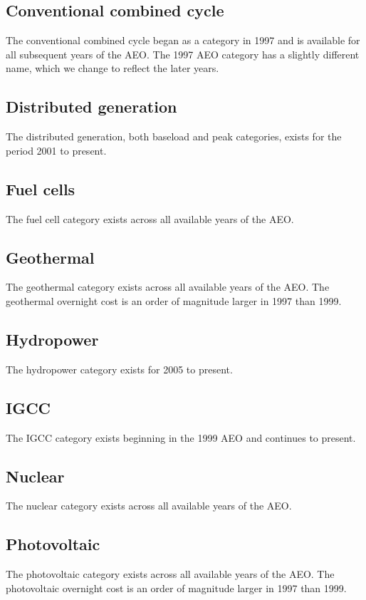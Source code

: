 \documentclass[10pt]{report}
\begin{document}
\subsection{Conventional combined cycle}
The conventional combined cycle began as a category in 1997 and is available for all subsequent years of the AEO. 
The 1997 AEO category has a slightly different name, which we change to reflect the later years. 

\subsection{Distributed generation}
The distributed generation, both baseload and peak categories, exists for the period 2001 to present. 

\subsection{Fuel cells}
The fuel cell category exists across all available years of the AEO.

\subsection{Geothermal}
The geothermal category exists across all available years of the AEO.
The geothermal overnight cost is an order of magnitude larger in 1997 than 1999.

\subsection{Hydropower}
The hydropower category exists for 2005 to present.

\subsection{IGCC}
The IGCC category exists beginning in the 1999 AEO and continues to present.  

\subsection{Nuclear}
The nuclear category exists across all available years of the AEO. 


\subsection{Photovoltaic} 
The photovoltaic category exists across all available years of the AEO. 
The photovoltaic overnight cost is an order of magnitude larger in 1997 than 1999.
\end{document}
